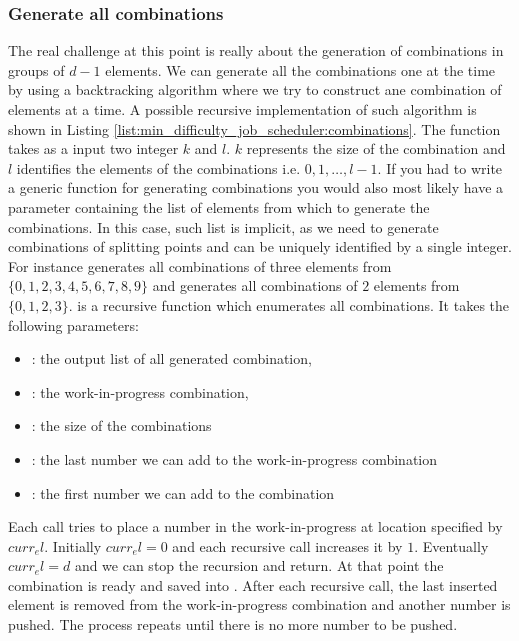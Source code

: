 \subsubsection{Generate all combinations}
The real challenge at this point is really about the generation of combinations in groups of $d-1$
elements. We can generate all the combinations one at the time by using a backtracking algorithm
where we try to construct ane combination of elements at a time. A possible recursive implementation
of such algorithm is shown in Listing \ref{list:min_difficulty_job_scheduler:combinations}. The
function  takes as a input two integer $k$ and $l$. $k$ represents
the size of the combination and $l$ identifies the elements of the combinations i.e. $0,1,\ldots,
l-1$. If you had to write a generic function for generating combinations you would also most likely
have a parameter containing the list of elements from which to generate the combinations. In this
case, such list is implicit, as we need to generate combinations of splitting points and can be
uniquely identified by a single integer. For instance 
generates all combinations of three elements from $\{0,1,2,3,4,5,6,7,8,9\}$ and
 generates all combinations of $2$ elements from
$\{0,1,2,3\}$.  is a recursive function which enumerates all
combinations. It takes the following parameters:
\begin{itemize}
    \item {}: the output list of all
    generated combination,
    \item {}: the work-in-progress combination,
    \item {}: the size of the combinations
    \item {}: the last number we can add to the work-in-progress combination
    \item {}: the first number we can add to the combination
\end{itemize}
Each call tries to place a number  in the work-in-progress  at location
specified by $curr_el$. Initially $curr_el = 0$ and each recursive call increases it by $1$.
Eventually $curr_el = d$ and we can stop the recursion and return. At that point the combination is
ready and saved into . After each recursive call, the last inserted element
is removed from the work-in-progress combination and another number is pushed. The process repeats
until there is no more number to be pushed.

